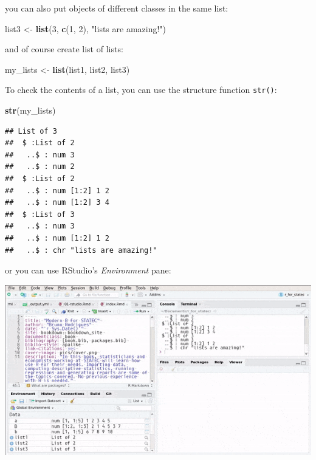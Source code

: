 \documentclass[]{gitbook}
\newenvironment{Shaded}{\begin{snugshade}}{\end{snugshade}}
\newcommand{\DecValTok}[1]{\textcolor[rgb]{0.00,0.00,0.81}{#1}}
\newcommand{\KeywordTok}[1]{\textcolor[rgb]{0.13,0.29,0.53}{\textbf{#1}}}
\newcommand{\NormalTok}[1]{#1}
\newcommand{\StringTok}[1]{\textcolor[rgb]{0.31,0.60,0.02}{#1}}
\theoremstyle{definition}
\theoremstyle{definition}
\theoremstyle{definition}
\theoremstyle{remark}
\begin{document}
you can also put objects of different classes in the same list:

\begin{Shaded}
\begin{Highlighting}[]
\NormalTok{list3 <-}\StringTok{ }\KeywordTok{list}\NormalTok{(}\DecValTok{3}\NormalTok{, }\KeywordTok{c}\NormalTok{(}\DecValTok{1}\NormalTok{, }\DecValTok{2}\NormalTok{), }\StringTok{"lists are amazing!"}\NormalTok{)}
\end{Highlighting}
\end{Shaded}

and of course create list of lists:

\begin{Shaded}
\begin{Highlighting}[]
\NormalTok{my_lists <-}\StringTok{ }\KeywordTok{list}\NormalTok{(list1, list2, list3)}
\end{Highlighting}
\end{Shaded}

To check the contents of a list, you can use the structure function
\texttt{str()}:

\begin{Shaded}
\begin{Highlighting}[]
\KeywordTok{str}\NormalTok{(my_lists)}
\end{Highlighting}
\end{Shaded}

\begin{verbatim}
## List of 3
##  $ :List of 2
##   ..$ : num 3
##   ..$ : num 2
##  $ :List of 2
##   ..$ : num [1:2] 1 2
##   ..$ : num [1:2] 3 4
##  $ :List of 3
##   ..$ : num 3
##   ..$ : num [1:2] 1 2
##   ..$ : chr "lists are amazing!"
\end{verbatim}

or you can use RStudio's \emph{Environment} pane:

\includegraphics{pics/rstudio_environment_list.gif}
\end{document}

